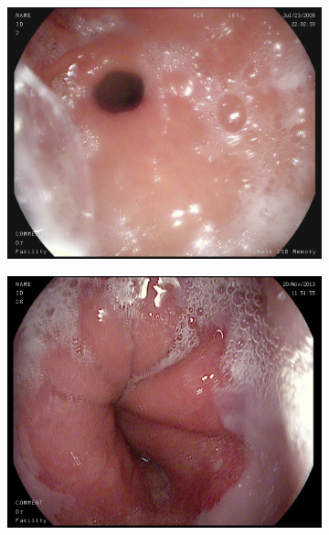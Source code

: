 \begin{figure}[t]
\begin{subfigure}[b]{0.4\textwidth}
            \caption[]%
            {{\small }}    
            \label{fig:zGAN}
        \end{subfigure}
        \qquad
        \begin{subfigure}[b]{0.4\textwidth}
            \centering
            \includegraphics[width=\textwidth]{experiments/images/normal-pylorus.jpg}
            \caption[Is this in use]%
            {{\small  }}    
            \label{fig:polypAEGREEN}
        \end{subfigure}
        \qquad
        \begin{subfigure}[b]{0.4\textwidth}  
            \centering 
            \includegraphics[width=\textwidth]{experiments/images/normal-z-line.jpg}

\end{subfigure}
\end{figure}
